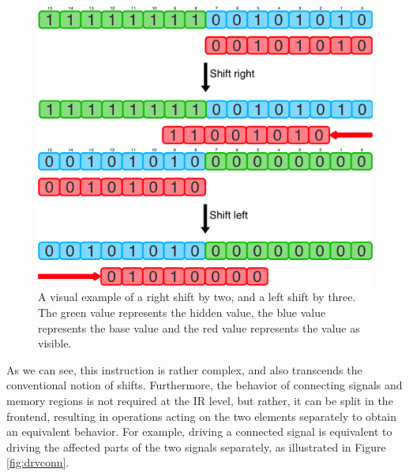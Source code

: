 \begin{figure}[ht]
    \centering
    \begin{minipage}{0.49\textwidth}
        \includegraphics[width=\textwidth]{gfx/ShiftRight.png}
    \end{minipage}
    \hfill
    \begin{minipage}{0.49\textwidth}
        \includegraphics[width=\textwidth]{gfx/ShiftLeft.png}
    \end{minipage}
    \caption[A visual example of a right and a left shift.]{A visual example of a right shift by two, and a left shift by three. The green value represents the hidden value, the blue value represents the base value and the red value represents the value as visible.}
    \label{fig:shr}
\end{figure}

As we can see, this instruction is rather complex, and also transcends the conventional notion of shifts. Furthermore, the behavior of connecting signals and memory regions is not required at the IR level, but rather, it can be split in the frontend, resulting in operations acting on the two elements separately to obtain an equivalent behavior. For example, driving a connected signal is equivalent to driving the affected parts of the two signals separately, as illustrated in Figure \ref{fig:drvconn}.

